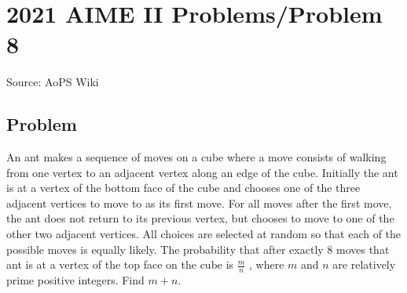 \documentclass[12pt]{article}
\begin{document}
\section*{{2021 AIME II Problems/Problem 8}}
Source: AoPS Wiki

\subsection*{Problem}
An ant makes a sequence of moves on a cube where a move consists of walking from one vertex to an adjacent vertex along an edge of the cube. Initially the ant is at a vertex of the bottom face of the cube and chooses one of the three adjacent vertices to move to as its first move. For all moves after the first move, the ant does not return to its previous vertex, but chooses to move to one of the other two adjacent vertices. All choices are selected at random so that each of the possible moves is equally likely. The probability that after exactly $8$ moves that ant is at a vertex of the top face on the cube is $\frac{m}{n}$ , where $m$ and $n$ are relatively prime positive integers. Find $m + n.$
\end{document}
